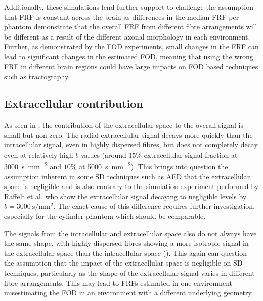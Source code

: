 Additionally, these simulations lend further support to challenge the assumption that \ac{FRF} is constant across the brain as differences in the median \ac{FRF} per phantom demonstrate that the overall \ac{FRF} from different fibre arrangements will be different as a result of the different axonal morphology in each environment. Further, as demonstrated by the \ac{FOD} experiments, small changes in the \ac{FRF} can lead to significant changes in the estimated \ac{FOD}, meaning that using the wrong \ac{FRF} in different brain regions could have large impacts on \ac{FOD} based techniques such as tractography. 


\subsection{Extracellular contribution}
\label{sec:frf_discussion_extra_contribution}
As seen in , the contribution of the extracellular space to the overall signal is small but non-zero.
The radial extracellular signal decays more quickly than the intracellular signal, even in highly dispersed fibres, but does not completely decay even at relatively high $b$-values (around $15\%$ extracellular signal fraction at \SI{3000}{\second\per\milli\metre\squared} and $10\%$ at \SI{5000}{\second\per\milli\metre\squared}).
This brings into question the assumption inherent in some \ac{SD} techniques such as \ac{AFD} that the extracellular space is negligible and is also contrary to the simulation experiment performed by Raffelt et al. \cite{Raffelt2012} who show the extracellular signal decaying to negligible levels by $b=\SI{3000}{\second\per\milli\metre\squared}$. The exact cause of this difference requires further investigation, especially for the cylinder phantom which should be comparable.

The signals from the intracellular and extracellular space also do not always have the same shape, with highly dispersed fibres showing a more isotropic signal in the extracellular space than the intracellular space ().
This again can question the assumption that the impact of the extracellular space is negligible on \ac{SD} techniques, particularly as the shape of the extracellular signal varies in different fibre arrangements. This may lead to \ac{FRF}s estimated in one environment misestimating the \ac{FOD} in an environment with a different underlying geometry.

